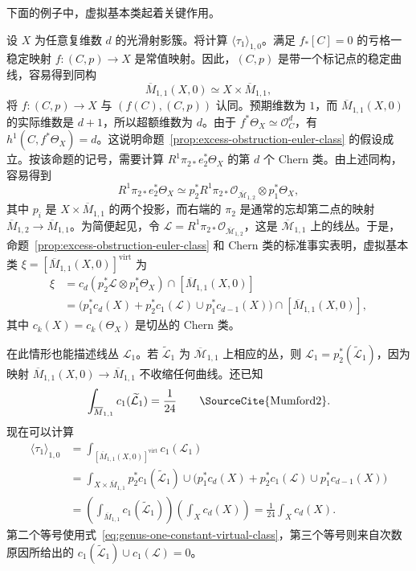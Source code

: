 下面的例子中，虚拟基本类起着关键作用。
\begin{example}\label{ex:genus-one-gravitational-euler}
设 $X$ 为任意复维数 $d$ 的光滑射影簇。将计算 $\langle\tau_1\rangle_{1,0}$。满足 $f_*[C]=0$ 的亏格一稳定映射 $f:(C,p)\to X$ 是常值映射。因此，$(C,p)$ 是带一个标记点的稳定曲线，容易得到同构
\[
\overline M_{1,1}(X,0)\simeq X\times\overline M_{1,1},
\]
将 $f:(C,p)\to X$ 与 $(f(C),(C,p))$ 认同。预期维数为 $1$，而 $\overline M_{1,1}(X,0)$ 的实际维数是 $d+1$，所以超额维数为 $d$。由于 $f^*\Theta_X\simeq\mathcal O_C^d$，有 $h^1(C,f^*\Theta_X)=d$。这说明命题~\ref{prop:excess-obstruction-euler-class} 的假设成立。按该命题的记号，需要计算 $R^1\pi_{2*}e_2^*\Theta_X$ 的第 $d$ 个 Chern 类。由上述同构，容易得到
\[
R^1\pi_{2*}e_2^*\Theta_X
\simeq p_2^*R^1\pi_{2*}\mathcal O_{\overline{\mathcal M}_{1,2}}\otimes p_1^*\Theta_X,
\]
其中 $p_i$ 是 $X\times\overline M_{1,1}$ 的两个投影，而右端的 $\pi_2$ 是通常的忘却第二点的映射 $\overline M_{1,2}\to\overline M_{1,1}$。为简便起见，令 $\mathcal L=R^1\pi_{2*}\mathcal O_{\overline{\mathcal M}_{1,2}}$，这是 $\overline{\mathcal M}_{1,1}$ 上的线丛。于是，命题~\ref{prop:excess-obstruction-euler-class}
和 Chern 类的标准事实表明，虚拟基本类 $\xi=[\overline M_{1,1}(X,0)]^{\mathrm{virt}}$ 为
\begin{equation}\label{eq:genus-one-constant-virtual-class}
\begin{aligned}
\xi&=c_d(p_2^*\mathcal L\otimes p_1^*\Theta_X)\cap[\overline M_{1,1}(X,0)]\\
&=\bigl(p_1^*c_d(X)+p_2^*c_1(\mathcal L)\cup p_1^*c_{d-1}(X)\bigr)
\cap[\overline M_{1,1}(X,0)],
\end{aligned}
\end{equation}
其中 $c_k(X)=c_k(\Theta_X)$ 是切丛的 Chern 类。

在此情形也能描述线丛 $\mathcal L_1$。若 $\widetilde{\mathcal L}_1$ 为 $\overline{\mathcal M}_{1,1}$ 上相应的丛，则 $\mathcal L_1=p_2^*(\widetilde{\mathcal L}_1)$，因为映射 $\overline M_{1,1}(X,0)\to\overline M_{1,1}$ 不收缩任何曲线。还已知
\[
\int_{\overline M_{1,1}}c_1(\widetilde{\mathcal L}_1)=\frac1{24}
\qquad\text{\SourceCite{Mumford2}}.
\]
现在可以计算
\[
\begin{aligned}
\langle\tau_1\rangle_{1,0}
&=\int_{[\overline M_{1,1}(X,0)]^{\mathrm{virt}}}c_1(\mathcal L_1)\\
&=\int_{X\times\overline M_{1,1}}
p_2^*c_1(\widetilde{\mathcal L}_1)\cup
\bigl(p_1^*c_d(X)+p_2^*c_1(\mathcal L)\cup p_1^*c_{d-1}(X)\bigr)\\
&=\left(\int_{\overline M_{1,1}}c_1(\widetilde{\mathcal L}_1)\right)
\left(\int_Xc_d(X)\right)
=\frac1{24}\int_Xc_d(X).
\end{aligned}
\]
第二个等号使用式~\eqref{eq:genus-one-constant-virtual-class}，第三个等号则来自次数原因所给出的 $c_1(\widetilde{\mathcal L}_1)\cup c_1(\mathcal L)=0$。


\end{example}
